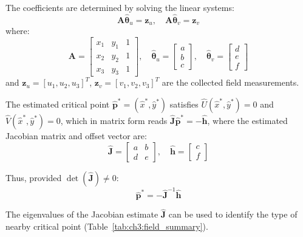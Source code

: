 The coefficients are determined by solving the linear systems:
\begin{equation}\label{eq:ch6:4}
\mathbf{A}\hat{\boldsymbol{\theta}}_u = \mathbf{z}_u, \quad \mathbf{A}\hat{\boldsymbol{\theta}}_v = \mathbf{z}_v
\end{equation}
where:
\begin{equation}\label{eq:ch6:5}
\mathbf{A} = \begin{bmatrix} x_1 & y_1 & 1 \\ x_2 & y_2 & 1 \\ x_3 & y_3 & 1 \end{bmatrix}, \quad \hat{\boldsymbol{\theta}}_u = \begin{bmatrix} a \\ b \\ c \end{bmatrix}, \quad \hat{\boldsymbol{\theta}}_v = \begin{bmatrix} d \\ e \\ f \end{bmatrix}
\end{equation}
and $\mathbf{z}_u = [u_1, u_2, u_3]^T$, $\mathbf{z}_v = [v_1, v_2, v_3]^T$ are the collected field measurements.

The estimated critical point $\hat{\mathbf{p}}^* = (\hat{x}^*, \hat{y}^*)$ satisfies $\hat{U}(\hat{x}^*, \hat{y}^*) = 0$ and $\hat{V}(\hat{x}^*, \hat{y}^*) = 0$, which in matrix form reads $\hat{\mathbf{J}}\hat{\mathbf{p}}^* = -\hat{\mathbf{h}}$, where the estimated Jacobian matrix and offset vector are:
\begin{equation}\label{eq:ch6:8}
\hat{\mathbf{J}} = \begin{bmatrix} a & b \\ d & e \end{bmatrix}, \quad \hat{\mathbf{h}} = \begin{bmatrix} c \\ f \end{bmatrix}
\end{equation}

Thus, provided $\det(\hat{\mathbf{J}}) \neq 0$:
\begin{equation}\label{eq:ch6:9}
\hat{\mathbf{p}}^* = -\hat{\mathbf{J}}^{-1}\hat{\mathbf{h}}
\end{equation}

The eigenvalues of the Jacobian estimate $\hat{\mathbf{J}}$ can be used to identify the type of nearby critical point (Table~\ref{tab:ch3:field_summary}).

